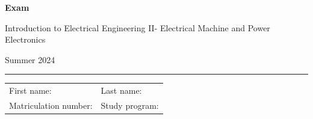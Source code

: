 \begin{center}

    {\vspace{3mm}\Large \textbf{
    \textsf{Exam}}
    \vspace{3mm}
    
    \LARGE
    \textsf{Introduction to Electrical Engineering II- Electrical Machine and Power Electronics}
    
    \vspace{6mm}
    \large
    
    Summer 2024
    \vspace{5mm}
    }
    
    
\end{center}
    
    \hrule
    
    
    \vspace{5mm}
    
\begin{flushleft}
\begin{tabular}{ll}
    First name:  \qquad \qquad \qquad  \qquad \qquad\qquad \qquad \qquad & Last name: \\[1cm]
     Matriculation number: & Study program:
\end{tabular}
\end{flushleft}



